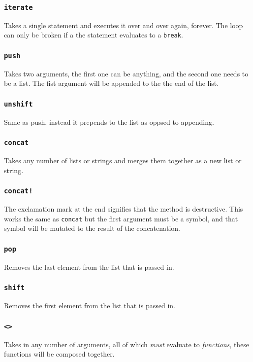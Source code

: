 \documentclass{article}
\newcommand{\code}[1]{\texttt{#1}}
\begin{document}
    \subsubsection{\code{iterate}}
      Takes a single statement and executes it over and over again, forever.
      The loop can only be broken if a the statement evaluates to a \code{break}.

    \subsubsection{\code{push}}
      Takes two arguments, the first one can be anything, and the second
      one needs to be a list.  The fist argument will be appended to the
      the end of the list.

    \subsubsection{\code{unshift}}
      Same as push, instead it prepends to the list as oppsed to
      appending.


    \subsubsection{\code{concat}}
      Takes any number of lists or strings and merges them together as
      a new list or string.

    \subsubsection{\code{concat!}}
      The exclamation mark at the end signifies that the method is
      destructive. This works the same as \code{concat} but the first
      argument must be a symbol, and that symbol will be mutated to
      the result of the concatenation.

    \subsubsection{\code{pop}}
      Removes the last element from the list that is passed in.

    \subsubsection{\code{shift}}
      Removes the first element from the list that is passed in.

    \subsubsection{\code{<>}}
      Takes in any number of arguments, all of which \emph{must} evaluate
      to \emph{functions}, these functions will be composed together.
\end{document}
